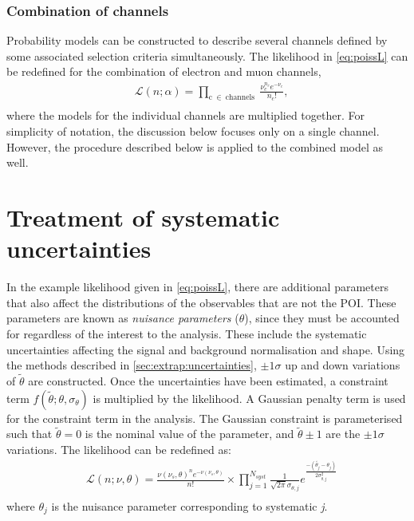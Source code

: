 \subsubsection{Combination of channels}
Probability models can be constructed to describe several channels defined by some associated selection criteria simultaneously. The likelihood in \cref{eq:poissL} can be redefined for the combination of electron and muon channels,
\begin{equation}
    \label{eq:poissLcomb}
    \begin{aligned}
        & \mathcal{L}(n;\alpha) = \prod_{\mathrm{c}~\in~\mathrm{channels}}~\frac{\nu_{c}^{n_{c}} e^{-\nu_{c}}}{n_{c}!}, \\
    \end{aligned}
\end{equation}
where the models for the individual channels are multiplied together. For simplicity of notation, the discussion below focuses only on a single channel. However, the procedure described below is applied to the combined model as well. 

\section{Treatment of systematic uncertainties}\label{sec:stats:nps}
In the example likelihood given in \cref{eq:poissL}, there are additional parameters that also affect the distributions of the observables that are not the POI. These parameters are known as \emph{nuisance parameters} ($\theta$), since they must be accounted for regardless of the interest to the analysis. These include the systematic uncertainties affecting the signal and background normalisation and shape. Using the methods described in \cref{sec:extrap:uncertainties}, $\pm 1\sigma$ up and down variations of $\tilde{\theta}$ are constructed. Once the uncertainties have been estimated, a constraint term $f(\tilde{\theta};\theta,\sigma_\theta)$ is multiplied by the likelihood. A Gaussian penalty term is used for the constraint term in the analysis. The Gaussian constraint is parameterised such that $\tilde{\theta} = 0$ is the nominal value of the parameter, and $\tilde{\theta} \pm 1$ are the $\pm1\sigma$ variations. The likelihood can be redefined as:
\begin{equation}
    \label{eq:likelihood}
    \begin{aligned}
        & \mathcal{L}(n;\nu,\theta) = \frac{\nu(\nu_s,\theta)^{n} e^{-\nu(\nu_s,\theta)}}{n!} \times \prod_{j=1}^{N_{syst}} \frac{1}{\sqrt{2\pi}\sigma_{\theta,j}} e^\frac{-(\tilde{\theta_j} - \theta_j)}{2\sigma_{\theta,j}^2} \\
    \end{aligned}
\end{equation}
where $\theta_j$ is the nuisance parameter corresponding to systematic \emph{j}. 

